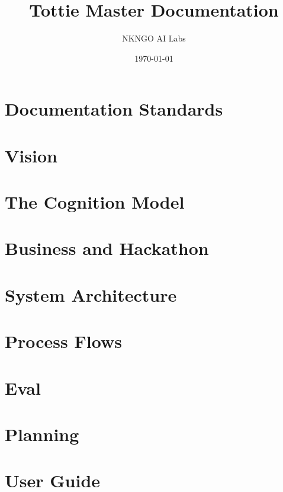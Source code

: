 \documentclass[11pt,oneside]{book}
\title{Tottie Master Documentation}
\author{NKNGO AI Labs}
\date{\today}
\begin{document}
\frontmatter
\maketitle
\tableofcontents
\mainmatter

\part{Documentation Standards}


\part{Vision}



\part{The Cognition Model}


\part{Business and Hackathon}



\part{System Architecture}










\part{Process Flows}










\part{Eval}


\part{Planning}






\part{User Guide}

\end{document}
